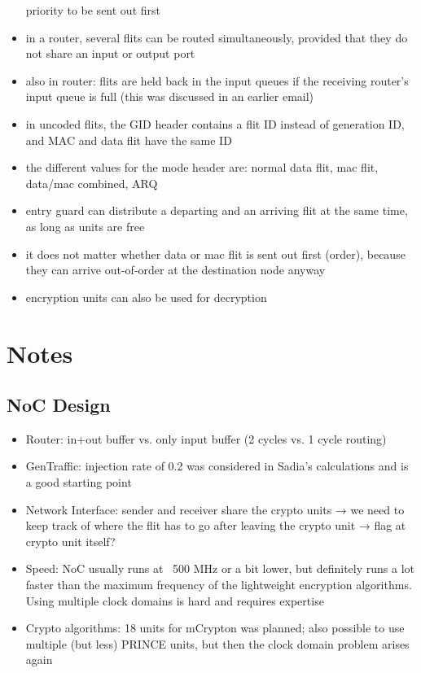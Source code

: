\documentclass[
	paper=a4,
	fontsize=11pt,
	parskip=full %
]{scrreprt}
\begin{document}
\begin{itemize}
            priority to be sent out first
        \item in a router, several flits can be routed simultaneously, provided that
            they do not share an input or output port
        \item also in router: flits are held back in the input queues if the
            receiving router's input queue is full (this was discussed in an earlier
            email)
        \item in uncoded flits, the GID header contains a flit ID instead of
            generation ID, and MAC and data flit have the same ID
        \item the different values for the mode header are: normal data flit, mac
            flit, data/mac combined, ARQ
        \item entry guard can distribute a departing and an arriving flit at the same
            time, as long as units are free
        \item it does not matter whether data or mac flit is sent out first (order),
            because they can arrive out-of-order at the destination node anyway
        \item encryption units can also be used for decryption
    \end{itemize}

    \chapter{Notes}
    \section{NoC Design}
    \begin{itemize}
        \item Router: in+out buffer vs. only input buffer (2 cycles vs. 1 cycle routing)
        \item GenTraffic: injection rate of 0.2 was considered in Sadia's calculations and is a good starting point
        \item Network Interface: sender and receiver share the crypto units → we need to keep track of where the flit has to go after leaving the crypto unit → flag at crypto unit itself?
        \item Speed: NoC usually runs at ~500 MHz or a bit lower, but definitely runs a lot faster than the maximum frequency of the lightweight encryption algorithms. Using multiple clock domains is hard and requires expertise
        \item Crypto algorithms: 18 units for mCrypton was planned; also possible to use multiple (but less) PRINCE units, but then the clock domain problem arises again
    \end{itemize}
	
	\printbibliography
\end{document}
